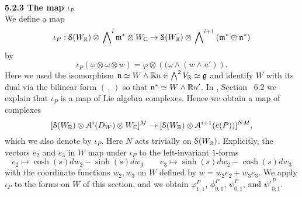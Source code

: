 \ \\[12pt] 
\textbf{5.2.3 The map $\iota_P$}\label{iotaP}
\\[10pt]
We define a map 
\[
\iota_P: \mathcal{S}(W_{\mathbb{R}}) \otimes \sideset{}{^{i}}\bigwedge \mathfrak{m}^{\ast} \otimes W_{\mathbb{C}} \to \mathcal{S}(W_{\mathbb{R}}) \otimes \sideset{}{^{i+1}}\bigwedge \left( \mathfrak{m}^{\ast} \oplus  \mathfrak{n}^{\ast} \right) 
\]
by 
\[
\iota_P(\varphi \otimes \omega \otimes w) = \varphi \otimes \left((\omega \wedge (w \wedge u')\right).
\]
Here we used the isomorphism $\mathfrak{n} \simeq W \wedge \mathbb{R} u \in \bigwedge^{2} V_{\mathbb{R}} \simeq \mathfrak{g}$ and identify $W$ with its dual via the bilinear form $(\,,\,)$ so that $\mathfrak{n}^{\ast} \simeq W \wedge \mathbb{R} u'$. In \cite{FMres}, Section ~6.2 we explain that $\iota_P$ is a map of Lie algebra complexes. Hence we obtain a map of complexes
\[
[\mathcal{S}(W_{\mathbb{R}}) \otimes \mathcal{A}^i(D_W) \otimes W_{\mathbb{C}}]^M \to [\mathcal{S}(W_{\mathbb{R}}) \otimes \mathcal{A}^{i+1}(e(P))]^{NM}, 
\]
which we also denote by $\iota_P$. Here $N$ acts trivially on $\mathcal{S}(W_{\mathbb{R}})$. Explicitly, the vectors $e_2$ and $e_3$ in $W$ map under $\iota_P$ to the left-invariant $1$-forms
\[
e_2 \mapsto \cosh(s)dw_2 - \sinh(s)dw_3 \qquad e_3 \mapsto \sinh(s)dw_2 - \cosh(s)dw_3
\]
with the coordinate functions $w_2,w_3$ on $W$ defined by $w=w_2e_2+w_3e_3$. We apply $\iota_P$ to the forms on $W$ of this section, and we obtain $\varphi_{1,1}^P$, $\phi_{0,1}^P$, $\psi_{0,1}^P$, and ${\psi'}_{0,1}^P$.

